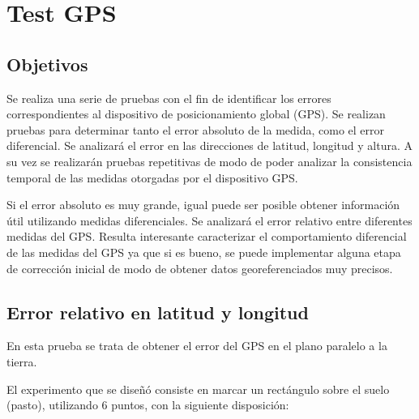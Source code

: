 \documentclass[spanish,12pt,a4paper,titlepage]{report}
\begin{document}
\chapter{Test GPS}

\section{Objetivos}

Se realiza una serie de pruebas con el fin de identificar los errores correspondientes al dispositivo de posicionamiento global (GPS). Se realizan pruebas para determinar tanto el error absoluto de la medida, como el error diferencial. Se analizará el error en las direcciones de latitud, longitud y altura. A su vez se realizarán pruebas repetitivas de modo de poder analizar la consistencia temporal de las medidas otorgadas por el dispositivo GPS.

Si el error absoluto es muy grande, igual puede ser posible obtener información útil utilizando medidas diferenciales. Se analizará el error relativo entre diferentes medidas del GPS. Resulta interesante caracterizar el comportamiento diferencial de las medidas del GPS ya que si es bueno, se puede implementar alguna etapa de corrección inicial de modo de obtener datos georeferenciados muy precisos.

%
%
\newpage
\section{Error relativo en latitud y longitud}

En esta prueba se trata de obtener el error del GPS en el plano paralelo a la tierra.

El experimento que se diseñó consiste en marcar un rectángulo sobre el suelo (pasto), utilizando 6 puntos, con la siguiente disposición:
\end{document}
